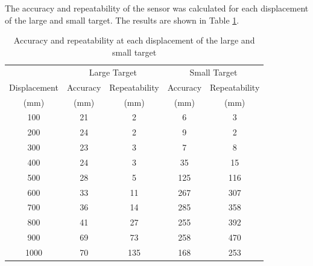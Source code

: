 \section{}
\subsection{}
The accuracy and repeatability of the sensor was calculated for each displacement of the large and small target. The results are shown in Table \ref{tab:Q3a}. 


\begin{table}[h]
    \centering
    \caption{Accuracy and repeatability at each displacement of the large and small target}
    \label{tab:Q3a}
    \begin{tabular}{ccccc}
        \hline
        & \multicolumn{2}{c}{Large Target} & \multicolumn{2}{c}{Small Target} \\
        Displacement & Accuracy & Repeatability & Accuracy & Repeatability \\
        (mm) & (mm) & (mm) & (mm) & (mm) \\
        \midrule
        100 & 21 & 2 & 6 & 3 \\
        200 & 24 & 2 & 9 & 2 \\
        300 & 23 & 3 & 7 & 8 \\
        400 & 24 & 3 & 35 & 15 \\
        500 & 28 & 5 & 125 & 116 \\
        600 & 33 & 11 & 267 & 307 \\
        700 & 36 & 14 & 285 & 358 \\
        800 & 41 & 27 & 255 & 392 \\
        900 & 69 & 73 & 258 & 470 \\
        1000 & 70 & 135 & 168 & 253 \\
        \hline
    \end{tabular}
\end{table}

